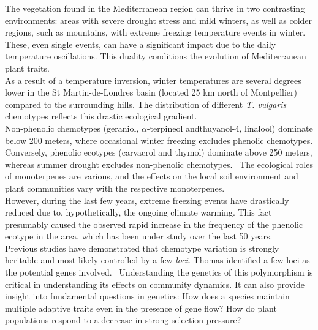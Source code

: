 The vegetation found in the Mediterranean region can thrive in two contrasting environments: areas with severe drought stress and mild winters, as well as colder regions, such as mountains, with extreme freezing temperature events in winter. These, even single events, can have a significant impact due to the daily temperature oscillations. This duality conditions the evolution of Mediterranean plant traits.~\cite{thompsonBibliography2020}\\

As a result of a temperature inversion, winter temperatures are several degrees lower in the St Martin-de-Londres basin (located 25 km north of Montpellier) compared to the surrounding hills. The distribution of different \textit{T. vulgaris} chemotypes reflects this drastic ecological gradient.~\cite{thompsonBibliography2020,bataillonGenotypePhenotypeGenetic2022} \\

Non-phenolic chemotypes (geraniol, $\alpha$-terpineol andthuyanol-4, linalool) dominate below 200 meters, where occasional winter freezing excludes phenolic chemotypes. Conversely, phenolic ecotypes (carvacrol and thymol) dominate above 250 meters, whereas summer drought excludes non-phenolic chemotypes.~\cite{thompsonBibliography2020} The ecological roles of monoterpenes are various, and the effects on the local soil environment and plant communities vary with the respective monoterpenes.~\cite{bataillonGenotypePhenotypeGenetic2022} \\

However, during the last few years, extreme freezing events have drastically reduced due to, hypothetically, the ongoing climate warming. This fact presumably caused the observed rapid increase in the frequency of the phenolic ecotype in the area, which has been under study over the last 50 years.~\cite{thompsonBibliography2020,bataillonGenotypePhenotypeGenetic2022} \\

Previous studies have demonstrated that chemotype variation is strongly heritable and most likely controlled by a few \textit{loci}. Thomas \etal identified a few loci as the potential genes involved.~\cite{bataillonGenotypePhenotypeGenetic2022}   Understanding the genetics of this polymorphism is critical in understanding its effects on community dynamics. It can also provide insight into fundamental questions in genetics: How does a species maintain multiple adaptive traits even in the presence of gene flow? How do plant populations respond to a decrease in strong selection pressure?~\cite{bataillonGenotypePhenotypeGenetic2022}\\

